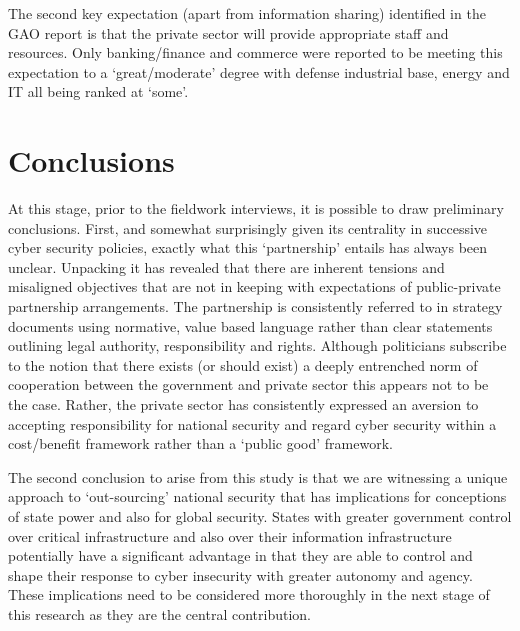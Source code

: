 \documentclass[a4paper,11pt]{article}
\begin{document}
The second key expectation (apart from information sharing) identified
in the GAO report is that the private sector will provide appropriate
staff and resources. Only banking/finance and commerce were reported
to be meeting this expectation to a `great/moderate' degree with
defense industrial base, energy and IT all being ranked at `some'. 

\section{Conclusions}

At this stage, prior to the fieldwork interviews, it is possible to
draw preliminary conclusions. First, and somewhat surprisingly given
its centrality in successive cyber security policies, exactly what
this `partnership' entails has always been unclear.  Unpacking it has
revealed that there are inherent tensions and misaligned objectives
that are not in keeping with expectations of public-private
partnership arrangements. The partnership is consistently referred to
in strategy documents using normative, value based language rather
than clear statements outlining legal authority, responsibility and
rights. Although politicians subscribe to the notion that there exists
(or should exist) a deeply entrenched norm of cooperation between the
government and private sector this appears not to be the case. Rather,
the private sector has consistently expressed an aversion to accepting
responsibility for national security and regard cyber security within
a cost/benefit framework rather than a `public good' framework. 

The second conclusion to arise from this study is that we are
witnessing a unique approach to `out-sourcing' national security that
has implications for conceptions of state power and also for global
security. States with greater government control over critical
infrastructure and also over their information infrastructure
potentially have a significant advantage in that they are able to
control and shape their response to cyber insecurity with greater
autonomy and agency. These implications need to be considered more
thoroughly in the next stage of this research as they are the central
contribution.



\end{document}
